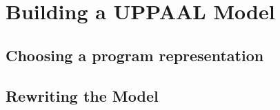 \chapter{Building a UPPAAL Model}
\section{Choosing a program representation}
\section{Rewriting the Model}